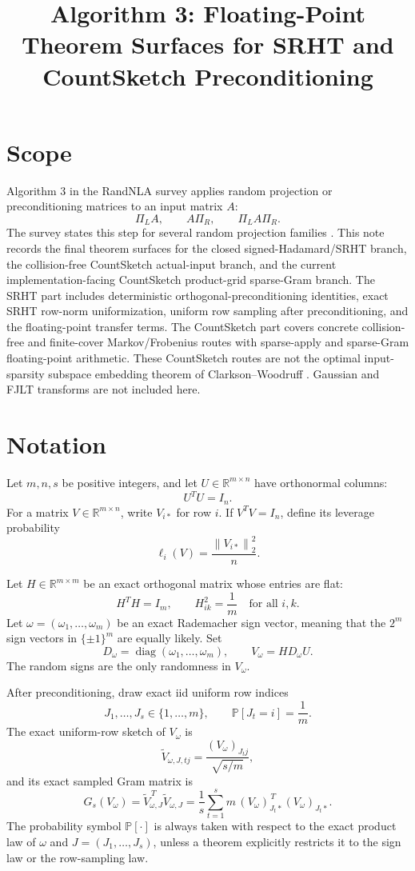 \documentclass[11pt]{article}
\title{Algorithm 3: Floating-Point Theorem Surfaces for SRHT and CountSketch Preconditioning}
\author{}
\date{}
\newcommand{\R}{\mathbb{R}}
\newcommand{\Prob}{\mathbb{P}}
\newcommand{\Norm}[1]{\left\lVert #1\right\rVert_2}
\newcommand{\I}{I}
\newcommand{\diag}{\operatorname{diag}}
\theoremstyle{remark}
\begin{document}
\sloppy

\maketitle

\section*{Scope}

Algorithm 3 in the RandNLA survey applies random projection or
preconditioning matrices to an input matrix \(A\):
\[
  \Pi_L A,\qquad A\Pi_R,\qquad \Pi_L A\Pi_R .
\]
The survey states this step for several random projection families
\cite{DrineasMahoney2016RandNLA}.  This note records the final theorem
surfaces for the closed signed-Hadamard/SRHT branch, the collision-free
CountSketch actual-input branch, and the current implementation-facing
CountSketch product-grid sparse-Gram branch.  The SRHT part includes
deterministic orthogonal-preconditioning identities, exact SRHT row-norm
uniformization, uniform row sampling after preconditioning, and the
floating-point transfer terms.  The CountSketch part covers concrete
collision-free and finite-cover Markov/Frobenius routes with sparse-apply and
sparse-Gram floating-point arithmetic.  These CountSketch routes are not the
optimal input-sparsity subspace embedding theorem of Clarkson--Woodruff
\cite{ClarksonWoodruff2013}.
Gaussian and FJLT transforms are not included here.

\section*{Notation}

Let \(m,n,s\) be positive integers, and let \(U\in\R^{m\times n}\) have
orthonormal columns:
\[
  U^T U=\I_n .
\]
For a matrix \(V\in\R^{m\times n}\), write \(V_{i*}\) for row \(i\).  If
\(V^TV=\I_n\), define its leverage probability
\[
  \ell_i(V)=\frac{\Norm{V_{i*}}^2}{n}.
\]

Let \(H\in\R^{m\times m}\) be an exact orthogonal matrix whose entries are
flat:
\[
  H^T H=\I_m,\qquad H_{ik}^2=\frac1m\quad\text{for all }i,k.
\]
Let \(\omega=(\omega_1,\ldots,\omega_m)\) be an exact Rademacher sign vector,
meaning that the \(2^m\) sign vectors in \(\{\pm1\}^m\) are equally likely.
Set
\[
  D_\omega=\diag(\omega_1,\ldots,\omega_m),\qquad
  V_\omega=H D_\omega U .
\]
The random signs are the only randomness in \(V_\omega\).

After preconditioning, draw exact iid uniform row indices
\[
  J_1,\ldots,J_s\in\{1,\ldots,m\},
  \qquad
  \Prob[J_t=i]=\frac1m .
\]
The exact uniform-row sketch of \(V_\omega\) is
\[
  \widetilde V_{\omega,J,tj}
  =
  \frac{(V_\omega)_{J_tj}}{\sqrt{s/m}} ,
\]
and its exact sampled Gram matrix is
\[
  G_s(V_\omega)
  =
  \widetilde V_{\omega,J}^{\,T}\widetilde V_{\omega,J}
  =
  \frac1s\sum_{t=1}^s m\,
  (V_\omega)_{J_t*}^{\,T}(V_\omega)_{J_t*}.
\]
The probability symbol \(\Prob[\cdot]\) is always taken with respect to the
exact product law of \(\omega\) and \(J=(J_1,\ldots,J_s)\), unless a theorem
explicitly restricts it to the sign law or the row-sampling law.
\end{document}
